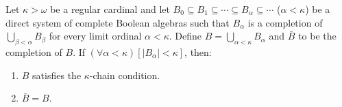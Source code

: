 Let $\kappa > \omega$ be a regular cardinal and let $B_0 \subseteq B_1 \subseteq \cdots \subseteq B_{\alpha} \subseteq \cdots$ ($\alpha < \kappa$) be a direct system of complete Boolean algebras such that $B_{\alpha}$ is a completion of $\bigcup_{\beta < \alpha} B_{\beta}$ for every limit ordinal $\alpha < \kappa$. Define $B = \bigcup_{\alpha < \kappa} B_{\alpha}$ and $\bar{B}$ to be the completion of $B$. If $(\forall \alpha < \kappa)[|B_{\alpha}| < \kappa]$, then:

\begin{enumerate}
\item $B$ satisfies the $\kappa$-chain condition.
\item $\bar{B} = B$.
\end{enumerate}
